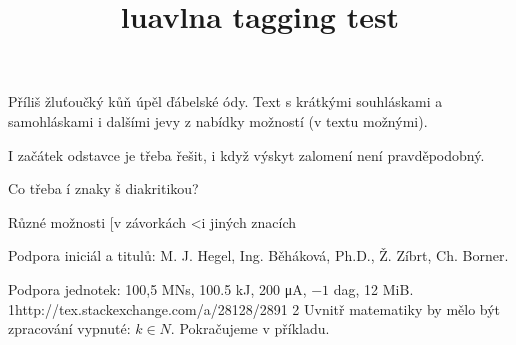 \documentclass{article}
\title{luavlna tagging test}
\begin{document}
Příliš žluťoučký kůň úpěl ďábelské ódy.
Text s krátkými souhláskami a samohláskami i dalšími jevy
z nabídky možností (v textu možnými).

I začátek odstavce je třeba řešit, i když výskyt zalomení
není pravděpodobný.

Co třeba í znaky š diakritikou?

Různé možnosti [v závorkách <i jiných znacích

Podpora iniciál a titulů: M. J. Hegel, Ing. Běháková, Ph.D., Ž. Zíbrt,
Ch. Borner.

Podpora jednotek: 100,5 MN\textperiodcentered s, 100.5 kJ, 200 μA, $-1$ dag,
12 MiB.
1http://tex.stackexchange.com/a/28128/2891
2
Uvnitř matematiky by mělo být zpracování vypnuté: $k \in N$.
Pokračujeme v příkladu.
\end{document}
